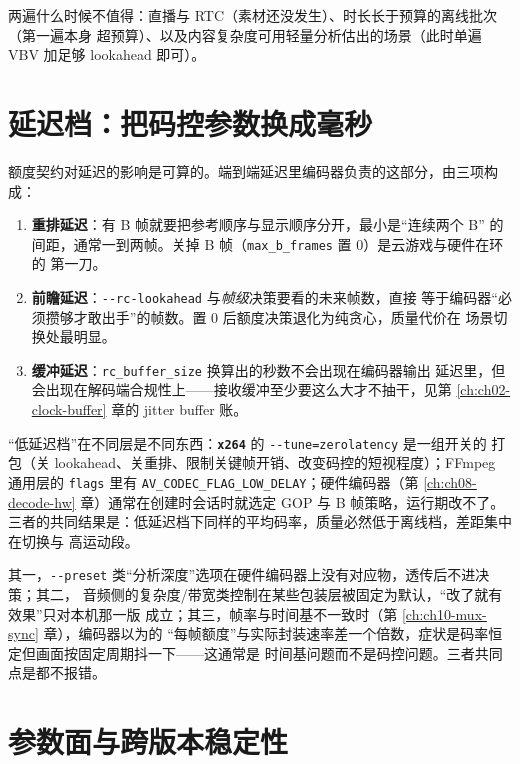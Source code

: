 \documentclass[12pt,a4paper,fontset=fandol]{ctexbook}
\newcommand{\Tp}[1]{\texttt{#1}}
\newcommand{\Opt}[1]{\texttt{-\/-#1}}
\newcommand{\Lib}[1]{\textbf{\texttt{#1}}}
\begin{document}
两遍什么时候不值得：直播与 RTC（素材还没发生）、时长长于预算的离线批次（第一遍本身
超预算）、以及内容复杂度可用轻量分析估出的场景（此时单遍 VBV 加足够 lookahead 即可）。

\section{延迟档：把码控参数换成毫秒}

额度契约对延迟的影响是可算的。端到端延迟里编码器负责的这部分，由三项构成：

\begin{enumerate}
\item \textbf{重排延迟}：有 B 帧就要把参考顺序与显示顺序分开，最小是``连续两个 B''
  的间距，通常一到两帧。关掉 B 帧（\Tp{max\_b\_frames} 置 0）是云游戏与硬件在环的
  第一刀。
\item \textbf{前瞻延迟}：\Opt{rc-lookahead} 与\emph{帧级}决策要看的未来帧数，直接
  等于编码器``必须攒够才敢出手''的帧数。置 0 后额度决策退化为纯贪心，质量代价在
  场景切换处最明显。
\item \textbf{缓冲延迟}：\Tp{rc\_buffer\_size} 换算出的秒数不会出现在编码器输出
  延迟里，但会出现在解码端合规性上——接收缓冲至少要这么大才不抽干，见第
  \ref{ch:ch02-clock-buffer} 章的 jitter buffer 账。
\end{enumerate}

``低延迟档''在不同层是不同东西：\Lib{x264} 的 \Opt{tune=zerolatency} 是一组开关的
打包（关 lookahead、关重排、限制关键帧开销、改变码控的短视程度）；FFmpeg 通用层的
\Tp{flags} 里有 \Tp{AV\_CODEC\_FLAG\_LOW\_DELAY}；硬件编码器（第
\ref{ch:ch08-decode-hw} 章）通常在创建时会话时就选定 GOP 与 B 帧策略，运行期改不了。
三者的共同结果是：低延迟档下同样的平均码率，质量必然低于离线档，差距集中在切换与
高运动段。

\begin{warning}[title={被静默降级的三个参数，低延迟配置里最常见}]
其一，\Opt{preset} 类``分析深度''选项在硬件编码器上没有对应物，透传后不进决策；其二，
音频侧的复杂度/带宽类控制在某些包装层被固定为默认，``改了就有效果''只对本机那一版
成立；其三，帧率与时间基不一致时（第 \ref{ch:ch10-mux-sync} 章），编码器以为的
``每帧额度''与实际封装速率差一个倍数，症状是码率恒定但画面按固定周期抖一下——这通常是
时间基问题而不是码控问题。三者共同点是都不报错。
\end{warning}

\section{参数面与跨版本稳定性}
\end{document}
